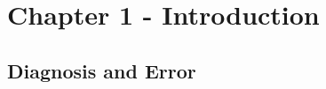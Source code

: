 \documentclass[a4paper, nobind]{templates/ociamthesis}
\begin{document}
\begin{romanpages}







\dominitoc %

\flushbottom




\end{romanpages}

\flushbottom

\chapter*{Chapter 1 - Introduction}\label{chapter-1---introduction}

\adjustmtc
{}

\section*{Diagnosis and Error}\label{diagnosis-and-error}
\end{document}
